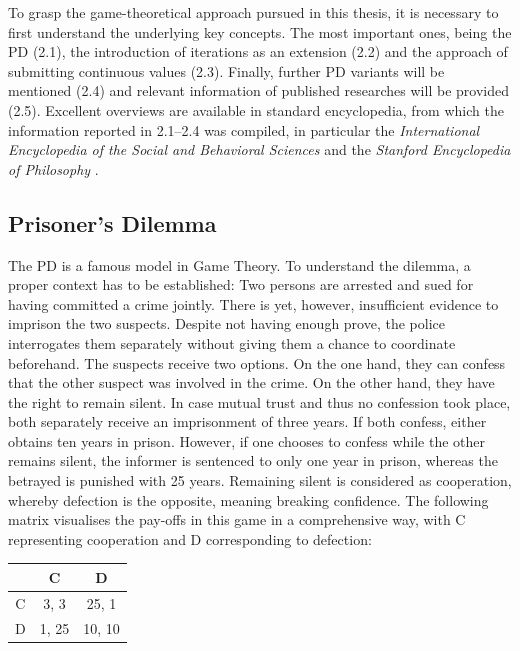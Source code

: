 \documentclass[11pt]{article}
\begin{document}
To grasp the game-theoretical approach pursued in this thesis, it is necessary to first understand the underlying key concepts. 
The most important ones, being the PD (2.1), the introduction of iterations as an extension (2.2) and the approach of submitting continuous values (2.3).
Finally, further PD variants will be mentioned (2.4) and relevant information of published researches will be provided (2.5).
Excellent overviews are available in standard encyclopedia, from which the information reported in 2.1–2.4 was compiled, in particular the \textit{International Encyclopedia of the Social and Behavioral Sciences} \cite{RC15} and the \textit{Stanford Encyclopedia of Philosophy} \cite{Kuh25}.

\subsection{Prisoner's Dilemma}
		
The PD is a famous model in Game Theory. 
To understand the dilemma, a proper context has to be established:
Two persons are arrested and sued for having committed a crime jointly.
There is yet, however, insufficient evidence to imprison the two suspects.
Despite not having enough prove, the police interrogates them separately without giving them a chance to coordinate beforehand.
The suspects receive two options.
On the one hand, they can confess that the other suspect was involved in the crime. 
On the other hand, they have the right to remain silent.
In case mutual trust and thus no confession took place, both separately receive an imprisonment of three years.
If both confess, either obtains ten years in prison.
However, if one chooses to confess while the other remains silent, the informer is sentenced to only one year in prison, whereas the betrayed is punished with 25 years.
Remaining silent is considered as cooperation, whereby defection is the opposite, meaning breaking confidence. 
The following matrix visualises the pay-offs in this game in a comprehensive way, with C representing cooperation and D corresponding to defection:

\begin{center}
\begin{tabular}{ c|c|c }
   & C & D \\ 
   \hline
 C & 3, 3 & 25, 1\\  
   \hline
 D & 1, 25 & 10, 10
\end{tabular}
\end{center}
\end{document}
